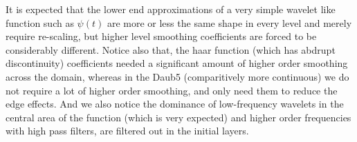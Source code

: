 \documentclass[12pt]{article}
\begin{document}
It is expected that the lower end approximations of a very simple wavelet like function such as $\psi(t)$ are more or less the same shape in every level and merely require re-scaling, but higher level smoothing coefficients are forced to be considerably different. Notice also that, the haar function (which has abdrupt discontinuity) coefficients needed a significant amount of higher order smoothing across the domain, whereas in the Daub5 (comparitively more continuous) we do not require a lot of higher order smoothing, and only need them to reduce the edge effects. And we also notice the dominance of low-frequency wavelets in the central area of the function (which is very expected) and higher order frequencies with high pass filters, are filtered out in the initial layers.
\end{document}
